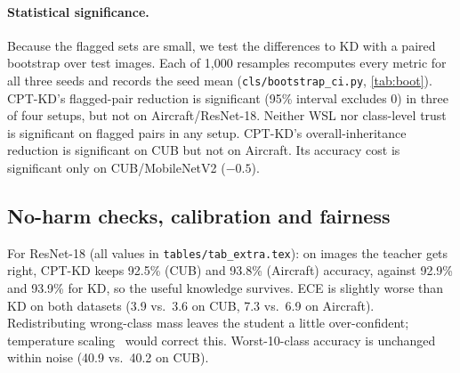 \documentclass[10pt,twocolumn,letterpaper]{article}
\begin{document}
\paragraph{Statistical significance.} Because the flagged sets are small, we test the differences to KD with a paired bootstrap over test images. Each of 1{,}000 resamples recomputes every metric for all three seeds and records the seed mean (\texttt{cls/bootstrap\_ci.py}, \cref{tab:boot}). CPT-KD's flagged-pair reduction is significant (95\% interval excludes 0) in three of four setups, but not on Aircraft/ResNet-18. Neither WSL nor class-level trust is significant on flagged pairs in any setup. CPT-KD's overall-inheritance reduction is significant on CUB but not on Aircraft. Its accuracy cost is significant only on CUB/MobileNetV2 ($-0.5$).

\begin{table}[t]
\centering\scriptsize
\setlength{\tabcolsep}{2pt}
\caption{\textbf{Paired bootstrap} (1{,}000 resamples of the test images, seed-averaged): difference to KD with 95\% interval. $^*$: interval excludes 0. Acc.\ is top-1 (CUB) or mean per-class (Aircraft).}
\label{tab:boot}
\resizebox{\linewidth}{!}{}
\end{table}

\begin{table}[t]
\centering\footnotesize\setlength{\tabcolsep}{4pt}
\caption{\textbf{CUB-200-2011} test results (mean $\pm$ std, 3 seeds). Inh.: teacher-error inheritance; Flag.: inheritance on flagged (low-trust) pairs; both in \%, lower is better. Teacher (ResNet-50): 82.5\% top-1.}
\label{tab:cub}

\end{table}

\begin{table}[t]
\centering\footnotesize\setlength{\tabcolsep}{4pt}
\caption{\textbf{FGVC-Aircraft} test results (mean $\pm$ std, 3 seeds); mAcc = mean per-class accuracy (official metric). Teacher (ResNet-50): 81.9\% top-1. DKD on ResNet-18 had one diverging seed (high std).}
\label{tab:air}

\end{table}

\subsection{No-harm checks, calibration and fairness}
For ResNet-18 (all values in \texttt{tables/tab\_extra.tex}): on images the teacher gets right, CPT-KD keeps 92.5\% (CUB) and 93.8\% (Aircraft) accuracy, against 92.9\% and 93.9\% for KD, so the useful knowledge survives. ECE is slightly worse than KD on both datasets (3.9 vs.\ 3.6 on CUB, 7.3 vs.\ 6.9 on Aircraft). Redistributing wrong-class mass leaves the student a little over-confident; temperature scaling~\cite{guo2017calibration} would correct this. Worst-10-class accuracy is unchanged within noise (40.9 vs.\ 40.2 on CUB).
\end{document}
